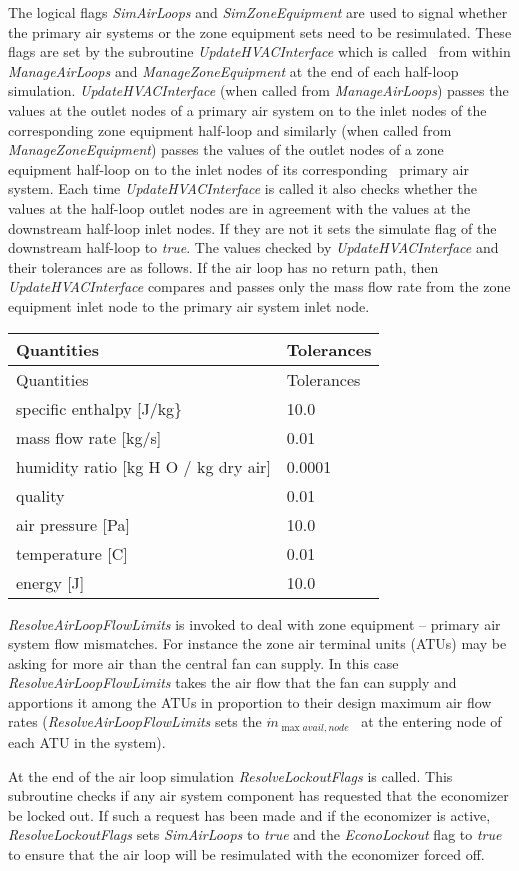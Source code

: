 The logical flags \emph{SimAirLoops} and \emph{SimZoneEquipment} are used to signal whether the primary air systems or the zone equipment sets need to be resimulated. These flags are set by the subroutine \emph{UpdateHVACInterface} which is called~ from within \emph{ManageAirLoops} and \emph{ManageZoneEquipment} at the end of each half-loop simulation. \emph{UpdateHVACInterface} (when called from \emph{ManageAirLoops}) passes the values at the outlet nodes of a primary air system on to the inlet nodes of the corresponding zone equipment half-loop and similarly (when called from \emph{ManageZoneEquipment}) passes the values of the outlet nodes of a zone equipment half-loop on to the inlet nodes of its corresponding~ primary air system. Each time \emph{UpdateHVACInterface} is called it also checks whether the values at the half-loop outlet nodes are in agreement with the values at the downstream half-loop inlet nodes. If they are not it sets the simulate flag of the downstream half-loop to \emph{true}. The values checked by \emph{UpdateHVACInterface} and their tolerances are as follows. If the air loop has no return path, then \emph{UpdateHVACInterface} compares and passes only the mass flow rate from the zone equipment inlet node to the primary air system inlet node.


\begin{longtable}[c]{@{}ll@{}}
\toprule 
Quantities & Tolerances \tabularnewline
\midrule
\endfirsthead

\toprule 
Quantities & Tolerances \tabularnewline
\midrule
\endhead

specific enthalpy [J/kg\} & 10.0 \tabularnewline
mass flow rate [kg/s] & 0.01 \tabularnewline
humidity ratio [kg H  O / kg dry air] & 0.0001 \tabularnewline
quality & 0.01 \tabularnewline
air pressure [Pa] & 10.0 \tabularnewline
temperature [C] & 0.01 \tabularnewline
energy [J] & 10.0 \tabularnewline
\bottomrule
\end{longtable}

\emph{ResolveAirLoopFlowLimits} is invoked to deal with zone equipment -- primary air system flow mismatches. For instance the zone air terminal units (ATUs) may be asking for more air than the central fan can supply. In this case \emph{ResolveAirLoopFlowLimits} takes the air flow that the fan can supply and apportions it among the ATUs in proportion to their design maximum air flow rates (\emph{ResolveAirLoopFlowLimits} sets the \({\dot m_{\max avail,node}}\) ~at the entering node of each ATU in the system).

At the end of the air loop simulation \emph{ResolveLockoutFlags} is called. This subroutine checks if any air system component has requested that the economizer be locked out. If such a request has been made and if the economizer is active, \emph{ResolveLockoutFlags} sets \emph{SimAirLoops} to \emph{true} and the \emph{EconoLockout} flag to \emph{true} to ensure that the air loop will be resimulated with the economizer forced off.
